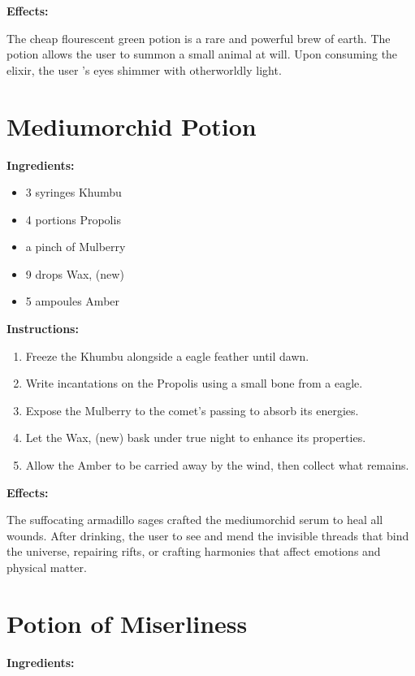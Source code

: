 \documentclass{article}
\begin{document}
\textbf{Effects:}

The cheap flourescent green potion is a rare and powerful brew of earth. The potion allows the user to summon a small animal at will. Upon consuming the elixir, the user 's eyes shimmer with otherworldly light.

\newpage
\section*{Mediumorchid Potion}

\textbf{Ingredients:}

\begin{itemize}
  \item 3 syringes Khumbu
  \item 4 portions Propolis
  \item a pinch of Mulberry
  \item 9 drops Wax, (new)
  \item 5 ampoules Amber
\end{itemize}

\textbf{Instructions:}

\begin{enumerate}
  \item Freeze the Khumbu alongside a eagle feather until dawn.
  \item Write incantations on the Propolis using a small bone from a eagle.
  \item Expose the Mulberry to the comet’s passing to absorb its energies.
  \item Let the Wax, (new) bask under true night to enhance its properties.
  \item Allow the Amber to be carried away by the wind, then collect what remains.
\end{enumerate}

\textbf{Effects:}

The suffocating armadillo sages crafted the mediumorchid serum to heal all wounds. After drinking, the user to see and mend the invisible threads that bind the universe, repairing rifts, or crafting harmonies that affect emotions and physical matter.

\newpage
\section*{Potion of Miserliness}

\textbf{Ingredients:}
\end{document}
